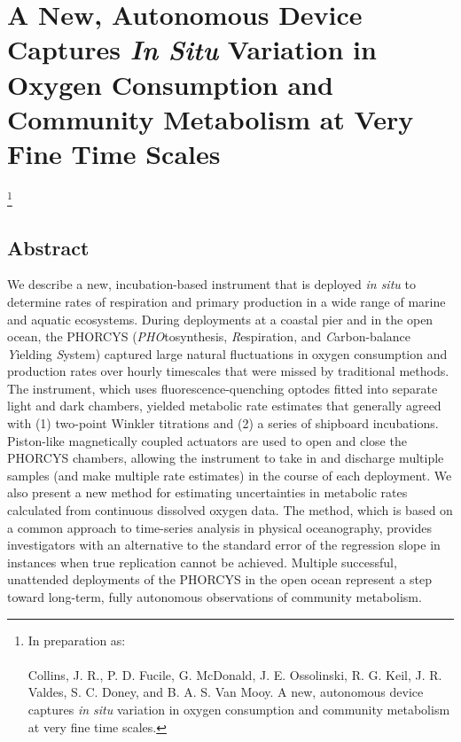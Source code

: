 
\begingroup%
\makeatletter%
\cleardoublepage%
\let\newpage\relax%
\let\clearpage\relax%
\vspace*{\fill}%
\vspace*{\dimexpr-50\p@-\baselineskip}%
\chapter{A New, Autonomous Device Captures \emph{In Situ} Variation in Oxygen Consumption and Community Metabolism at Very Fine Time Scales}
\label{AppA}
\let\thefootnote\relax\footnote{{\setlength{\parindent}{0pt}In preparation as:\\\\Collins, J. R., P. D. Fucile, G. McDonald, J. E. Ossolinski, R. G. Keil, J. R. Valdes, S. C. Doney, and B. A. S. Van Mooy. A new, autonomous device captures \emph{in situ} variation in oxygen consumption and community metabolism at very fine time scales.}}
\vspace*{\fill}%
\endgroup%

\clearpage
\section{Abstract}
We describe a new, incubation-based instrument that is deployed \emph{in situ} to determine rates of respiration and primary production in a wide range of marine and aquatic ecosystems. During deployments at a coastal pier and in the open ocean, the PHORCYS (\emph{PHO}tosynthesis, \emph{R}espiration, and \emph{C}arbon-balance \emph{Y}ielding \emph{S}ystem) captured large natural fluctuations in oxygen consumption and production rates over hourly timescales that were missed by traditional methods. The instrument, which uses fluorescence-quenching optodes fitted into separate light and dark chambers, yielded metabolic rate estimates that generally agreed with (1) two-point Winkler titrations and (2) a series of shipboard incubations. Piston-like magnetically coupled actuators are used to open and close the PHORCYS chambers, allowing the instrument to take in and discharge multiple samples (and make multiple rate estimates) in the course of each deployment. We also present a new method for estimating uncertainties in metabolic rates calculated from continuous dissolved oxygen data. The method, which is based on a common approach to time-series analysis in physical oceanography, provides investigators with an alternative to the standard error of the regression slope in instances when true replication cannot be achieved. Multiple successful, unattended deployments of the PHORCYS in the open ocean represent a step toward long-term, fully autonomous observations of community metabolism.
\clearpage
